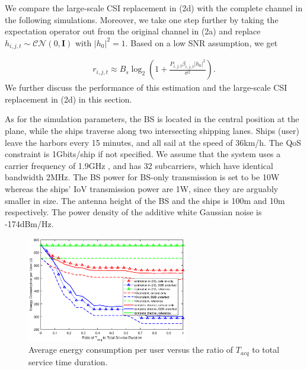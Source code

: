 \documentclass[conference]{IEEEtran}
\begin{document}
We compare the large-scale CSI replacement in (2d) with the complete channel in the following simulations. Moreover, we take one step further by taking the expectation operator out from the original channel in (2a) and replace ${h_{i,j,t}} \sim \mathcal{CN}(0, \mathbf{I})$ with ${\left| {{h_0}} \right|^2} = 1$. Based on a low SNR assumption, we get 

\begin{align}
{r_{i,j,t}} \approx {B_s}{\log _2}\left( {1 + \frac{{{P_{i,j,t}}{\beta _{i,j,t}}{{\left| {{h_0}} \right|}^2}}}{{{\sigma ^2}}}} \right).
\end{align}
We further discuss the performance of this estimation and the large-scale CSI replacement in (2d) in this section.

As for the simulation parameters, the BS is located in the central position at the plane, while the ships traverse along two intersecting shipping lanes.
Ships (user) leave the harbors every 15 minutes, and all sail at the speed of 36km/h. The QoS constraint is 1Gbits/ship if not specified. We assume that the system uses a carrier frequency of 1.9GHz , and has 32 subcarriers, which have identical bandwidth 2MHz. The BS power for BS-only transmission is set to be 10W whereas the ships' IoV transmission power are 1W, since they are arguably smaller in size. The antenna height of the BS and the ships is 100m and 10m respectively. The power density of the additive white Gaussian noise is -174dBm/Hz.


\begin{figure} [htb]
\begin{center}
\includegraphics*[width=7cm]{Tranges.eps}
\end{center}
\vspace*{-4mm} 
\caption{Average energy consumption per user versus the ratio of ${T_{acq}}$ to total service time duration.} \label{fig:2}
\vspace*{-2mm} 
\end{figure}
\end{document}
